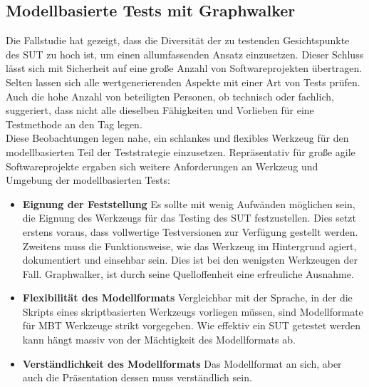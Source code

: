\subsection{Modellbasierte Tests mit Graphwalker}
\label{sec:mbt_results}
Die Fallstudie hat gezeigt, dass die Diversität der zu testenden Gesichtspunkte des \Gls{SUT} zu hoch ist, um einen allumfassenden Ansatz einzusetzen. Dieser Schluss lässt sich mit Sicherheit auf eine große Anzahl von Softwareprojekten übertragen. Selten lassen sich alle wertgenerierenden Aspekte mit einer Art von Tests prüfen. Auch die hohe Anzahl von beteiligten Personen, ob technisch oder fachlich, suggeriert, dass nicht alle dieselben Fähigkeiten und Vorlieben für eine Testmethode an den Tag legen.\\
Diese Beobachtungen legen nahe, ein schlankes und flexibles Werkzeug für den modellbasierten Teil der Teststrategie einzusetzen. Repräsentativ für große agile Softwareprojekte ergaben sich weitere Anforderungen an Werkzeug und Umgebung der modellbasierten Tests:

\begin{itemize} 
\item\textbf{Eignung der Feststellung} Es sollte mit wenig Aufwänden möglichen sein, die Eignung des Werkzeugs für das Testing des \Gls{SUT} festzustellen. Dies setzt erstens voraus, dass vollwertige Testversionen zur Verfügung gestellt werden. Zweitens muss die Funktionsweise, wie das Werkzeug im Hintergrund agiert, dokumentiert und einsehbar sein. Dies ist bei den wenigsten Werkzeugen der Fall. Graphwalker, ist durch seine Quelloffenheit eine erfreuliche Ausnahme.
\item \textbf{Flexibilität des Modellformats} Vergleichbar mit der Sprache, in der die Skripts eines skriptbasierten Werkzeugs vorliegen müssen, sind Modellformate für \Gls{MBT} Werkzeuge strikt vorgegeben. Wie effektiv ein \Gls{SUT} getestet werden kann hängt massiv von der Mächtigkeit des Modellformats ab.
\item \textbf{Verständlichkeit des Modellformats} Das Modellformat an sich, aber auch die Präsentation dessen muss verständlich sein.
\end{itemize}

